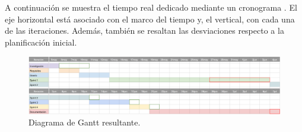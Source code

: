 A continuación se muestra el tiempo real dedicado mediante un cronograma . El eje horizontal está asociado con el marco del tiempo y, el vertical, con cada una de las iteraciones. Además, también se resaltan las desviaciones respecto a la planificación inicial.\sn

\begin{figure}[H]
    \centering
    \includegraphics[width=15cm]{img/tables/10_Real-Gantt.png}
    \caption{Diagrama de Gantt resultante.}
    \label{fig:realgantt}
\end{figure}
